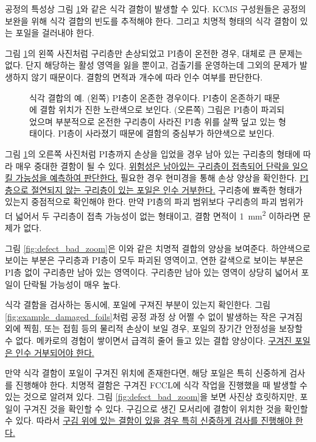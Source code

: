 공정의 특성상 그림 \ref{fig:example_defect}와 같은 식각 결함이 발생할 수 있다. KCMS 구성원들은 공정의 보완을 위해 식각 결합의 빈도를 추적해야 한다. 그리고 치명적 형태의 식각 결함이 있는 포일을 걸러내야 한다. 

그림 \ref{fig:example_defect}의 왼쪽 사진처럼 구리층만 손상되었고 PI층이 온전한 경우, 대체로 큰 문제는 없다. 단지 해당하는 활성 영역을 잃을 뿐이고, 검출기를 운영하는데 그외의 문제가 발생하지 않기 때문이다. 결함의 면적과 개수에 따라 인수 여부를 판단한다.

\begin{figure}[htb]
  \centering
  \caption[식각 결합의 예]{식각 결합의 예. (왼쪽) PI층이 온존한 경우이다. PI층이 온존하기 때문에 결함 위치가 진한 노란색으로 보인다. (오른쪽) 그림은 PI층이 파괴되었으며 부분적으로 온전한 구리층이 사라진 PI층 위를 살짝 덮고 있는 형태이다. PI층이 사라졌기 때문에 결함의 중심부가 하얀색으로 보인다.}
  \label{fig:example_defect}
\end{figure}

그림 \ref{fig:example_defect}의 오른쪽 사진처럼 PI층까지 손상을 입었을 경우 남아 있는 구리층의 형태에 따라 매우 중대한 결함이 될 수 있다. \uline{위험성은 남아있는 구리층이 접촉되어 단락을 일으킬 가능성을 예측하여 판단한다.} 필요한 경우 현미경을 통해 손상 양상을 확인한다. \uline{PI층으로 절연되지 않는 구리층이 있는 포일은 인수 거부한다.} 구리층에 뾰족한 형태가 있는지 중점적으로 확인해야 한다. 만약 PI층의 파괴 범위보다 구리층의 파괴 범위가 더 넓어서 두 구리층이 접촉 가능성이 없는 형태이고, 결함 면적이 \SI{1}{\milli\meter\squared} 이하라면 문제가 없다. 

그림 \ref{fig:defect_bad_zoom}은 이와 같은 치명적 결합의 양상을 보여준다. 하얀색으로 보이는 부분은 구리층과  PI층이 모두 파괴된 영역이고, 연한 갈색으로 보이는 부분은 PI층 없이 구리층만 남아 있는 영역이다. 구리층만 남아 있는 영역이 상당히 넓어서 포일이 단락될 가능성이 매우 높다.

식각 결함을 검사하는 동시에, 포일에 구져진 부분이 있는지 확인한다. 그림 \ref{fig:example_damaged_foils}처럼 공정 과정 상 어쩔 수 없이 발생하는 작은 구겨짐 외에 찍힘, 또는 접힘 등의 물리적 손상이 보일 경우, 포일의 장기간 안정성을 보장할 수 없다. 메카로의 경험이 쌓이면서 급격히 줄어 들고 있는 결합 양상이다. \uline{구겨진 포일은 인수 거부되어야 한다.}

만약 식각 결함이 포일이 구겨진 위치에 존재한다면, 해당 포일은 특히 신중하게 검사를 진행해야 한다. 치명적 결함은 구겨진 FCCL에 식각 작업을 진행했을 때 발생할 수 있는 것으로 알려져 있다. 그림 \ref{fig:defect_bad_zoom}을 보면 사진상 흐릿하지만, 포일이 구겨진 것을 확인할 수 있다. 구김으로 생긴 모서리에 결함이 위치한 것을 확인할 수 있다. 따라서 \uline{구김 위에 있는 결함이 있을 경우 특히 신중하게 검사를 진행해야 한다.}

